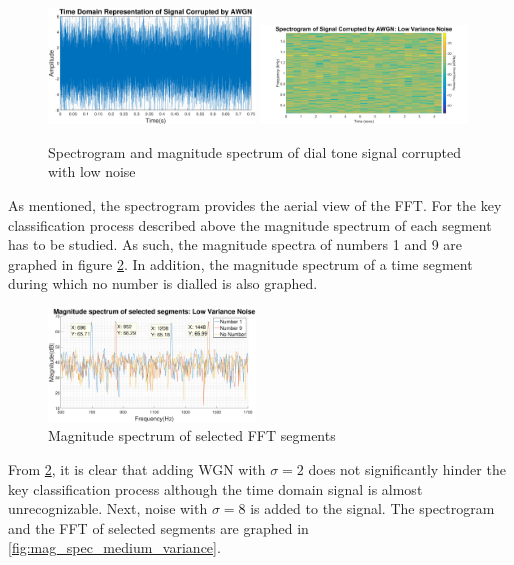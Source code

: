 \documentclass{article}
\begin{document}
\begin{figure}[H]
    \centering
    \includegraphics[width=0.49\textwidth]{phone_num_noisy}
    \includegraphics[width=0.49\textwidth,natwidth=610,natheight=642]{spectrogram_low_var.png}
    \caption{Spectrogram and magnitude spectrum of dial tone signal corrupted with low noise}
    \label{fig:spec_low_noise}
\end{figure}

As mentioned, the spectrogram provides the aerial view of the FFT. For the key classification process described above the magnitude spectrum of each segment has to be studied. As such, the magnitude spectra of numbers 1 and 9 are graphed in figure \ref{fig:mag_spec_low_var}. In addition, the magnitude spectrum of a time segment during which no number is dialled is also graphed. 

\begin{figure}[H]
    \centering
    \includegraphics[width=0.49\textwidth]{mag_spec_dial_tone_low_var}
    \caption{Magnitude spectrum of selected FFT segments}
    \label{fig:mag_spec_low_var}
\end{figure}

From \ref{fig:mag_spec_low_var}, it is clear that adding WGN with $\sigma = 2$ does not significantly hinder the key classification process although the time domain signal is almost unrecognizable. Next, noise with $\sigma=8$ is added to the signal. The spectrogram and the FFT of selected segments are graphed in \ref{fig:mag_spec_medium_variance}.
\end{document}
